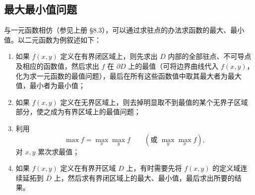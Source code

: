 \subsection{最大最小值问题}

与一元函数相仿（参见上册 §8.3），可以通过求驻点的办法求函数的最大、最小值。以二元函数为例叙述如下：
\begin{enumerate}[label=\arabic*.]
  \item 如果 $f(x,y)$ 定义在有界闭区域上，则先求出 $D$ 内部的全部驻点、不可导点及相应的函数值，然后求出 $f$ 在 $\partial D$ 上的最值（可将边界曲线代入 $f(x,y)$，化为求一元函数的最值问题），最后在所有这些函数值中取其最大者为最大值，最小者为最小值；
  \item 如果 $f(x,y)$ 定义在无界区域上，则去掉明显取不到最值的某个无界子区域部分，使之成为有界区域上的最值问题；
  \item 利用
  \[
    \max f=\max_x\max_y f\qquad(\text{或 }\max_y\max_x f),
  \]
  对 $x,y$ 累次求最值；
  \item 如果 $f(x,y)$ 定义在有界开区域 $D$ 上，有时需要先将 $f(x,y)$ 的定义域连续延拓到 $\overline D$ 上，然后求有界闭区域上的最大、最小值，最后求出所要的结果。
\end{enumerate}

